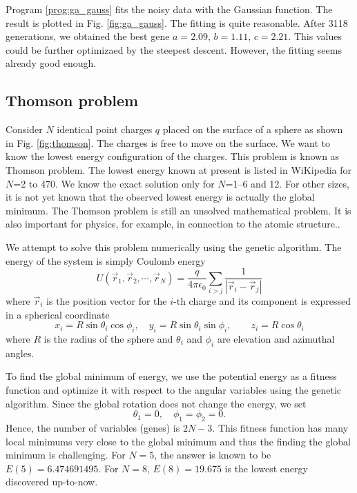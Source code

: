 Program \ref{prog:ga_gauss} fits the noisy data with the Gaussian function.  The result is plotted in Fig. \ref{fig:ga_gauss}.
The fitting is quite reasonable.  After 3118 generations, we obtained the best gene $a=2.09$, $b=1.11$, $c=2.21$. This values could be further optimizaed by the steepest descent.  However, the fitting seems already good enough.

\subsection{Thomson problem}

Consider $N$ identical point charges $q$ placed on the surface of a sphere as shown in Fig. \ref{fig:thomson}.  The charges is free to move on the surface.  We want to know the lowest energy configuration of the charges. This problem is known as Thomson problem.\cite{thomson}  The lowest energy known at present is listed in WiKipedia for $N$=2 to 470.  We know the exact solution only for $N$=1--6 and 12.  For other sizes, it is not yet known that the observed lowest energy is actually the global minimum.  The Thomson problem is still an unsolved mathematical problem.  It is also important for physics, for example, in connection to the atomic structure.\cite{LaFave}.

We attempt to solve this problem numerically using the genetic algorithm.
The energy of the system is simply Coulomb energy
\begin{equation}
U(\vec{r}_1, \vec{r}_2, \cdots, \vec{r}_N) =  \frac{q}{4 \pi \epsilon_0} \sum_{i>j} \frac{1}{|\vec{r}_i - \vec{r}_j|}
\end{equation}
where $\vec{r}_i$ is the position vector for the $i$-th charge and its component is expressed in a spherical coordinate
\begin{equation}
x_i = R \sin\theta_i \cos\phi_i, \quad y_i=R \sin\theta_i \sin\phi_i, \qquad z_i = R \cos\theta_i
\end{equation}
where $R$ is the radius of the sphere and $\theta_i$ and $\phi_i$ are elevation and azimuthal angles.

To find the global minimum of energy, we use the potential energy as a fitness function and optimize it with respect to the angular variables using the genetic algorithm.
Since the global rotation does not change the energy, we set
\begin{equation}
\theta_1=0, \quad \phi_1=\phi_2=0.
\end{equation}
Hence, the number of variables (genes) is $2N-3$.
This fitness function has many local minimums very close to the global minimum and thus the finding the global minimum is challenging.  For $N=5$, the answer is known to be $E(5)=6.474691495$.  For $N=8$, $E(8)=19.675$ is the lowest energy discovered up-to-now.  

